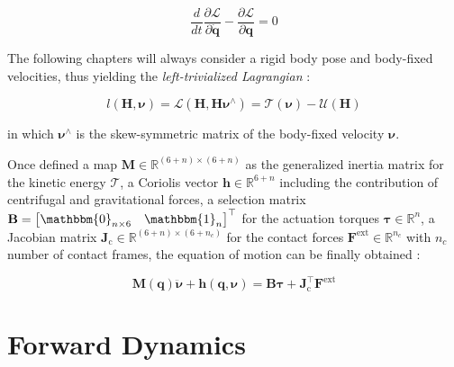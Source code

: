 \begin{equation}
    \frac{d}{dt} \frac{\partial \mathcal{L}}{\partial \mathbf{\dot{q}}} - \frac{\partial \mathcal{L}}{\partial \mathbf{q}} = 0
    \label{eqn:lagrangian}
\end{equation}

The following chapters will always consider a rigid body pose and body-fixed velocities, thus yielding the \textit{left-trivialized Lagrangian} \citep{traversaro_modelling_2019}:

\begin{equation}
    l(\mathbf{H}, \boldsymbol{\nu}) = \mathcal{L}(\mathbf{H}, \mathbf{H}\boldsymbol{\nu}^\wedge) = \mathcal{T}(\boldsymbol{\nu}) - \mathcal{U}(\mathbf{H})
\end{equation}

in which $\boldsymbol{\nu}^\wedge$ is the skew-symmetric matrix of the body-fixed velocity $\boldsymbol{\nu}$.

Once defined a map $\mathbf{M} \in \mathbb{R}^{(6+n) \times (6+n)}$ as the generalized inertia matrix for the kinetic energy $\mathcal{T}$, a Coriolis vector $\mathbf{h} \in \mathbb{R} ^{6+n}$ including the contribution of centrifugal and gravitational forces, a selection matrix $\mathbf{B} = \begin{bmatrix} \mathbbm{0}_{n\times6} & \mathbbm{1}_n \end{bmatrix}^\top$ for the actuation torques $\boldsymbol{\tau} \in \mathbb{R} ^n$, a Jacobian matrix $\mathbf{J} _\text{c} \in \mathbb{R} ^{(6+n) \times (6+n_c)}$ for the contact forces  $\mathbf{F} ^\text{ext} \in \mathbb{R} ^{n_c}$ with $n_c$ number of contact frames, the equation of motion can be finally obtained \citep{SicilianoKhatib2008}:

\begin{equation}
    \label{eqn:equation_of_motion}
    \mathbf{M}(\mathbf{q}) \mathbf{\ddot{\boldsymbol{\nu}}} + \mathbf{h} (\mathbf{q}, \boldsymbol{\nu}) = \mathbf{B}\boldsymbol{\tau} + \mathbf{J}^\top _\text{c} \mathbf{F} ^\text{ext}
\end{equation}


\section{Forward Dynamics}
\label{sec:back_fd}

